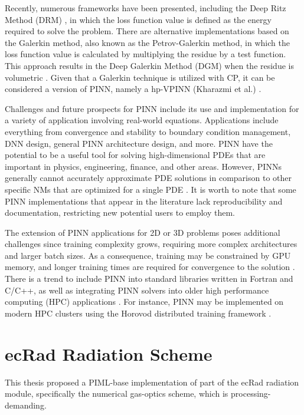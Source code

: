 Recently, numerous frameworks have been presented, including the Deep Ritz Method (DRM) \cite{E2017}, in which the loss function value is defined as the energy required to solve the problem. There are alternative implementations based on the Galerkin method, also known as the Petrov-Galerkin method, in which the loss function value is calculated by multiplying the residue by a test function. This approach results in the Deep Galerkin Method (DGM) when the residue is volumetric \cite{Sirignano2018}. Given that a Galerkin technique is utilized with CP, it can be considered a version of PINN, namely a hp-VPINN (Kharazmi et al.) \cite{Kharazmi2021}.

Challenges and future prospects for PINN include its use and implementation for a variety of application involving real-world equations. Applications include everything from convergence and stability to boundary condition management, DNN design, general PINN architecture design, and more. PINN have the potential to be a useful tool for solving high-dimensional PDEs that are important in physics, engineering, finance, and other areas. However, PINNs generally cannot accurately approximate PDE solutions in comparison to other specific NMs that are optimized for a single PDE \cite{Cuomo2022}. It is worth to note that some PINN implementations that appear in the literature lack reproducibility and documentation, restricting new potential users to employ them.

The extension of PINN applications for 2D or 3D problems poses additional challenges since training complexity grows, requiring more complex architectures and larger batch sizes. As a consequence, training may be constrained by GPU memory, and longer training times are required for convergence to the solution \cite{Nandi2021}. There is a trend to include PINN into standard libraries written in Fortran and C/C++, as well as integrating PINN solvers into older high performance computing (HPC) applications \cite{Markidis2021}. For instance, PINN may be implemented on modern HPC clusters using the Horovod distributed training framework \cite{Sergeev2018}.


\section{ecRad Radiation Scheme}
\label{sec:ers}

This thesis proposed a PIML-base implementation of part of the ecRad radiation module, specifically the numerical gas-optics scheme, which is processing-demanding.  

